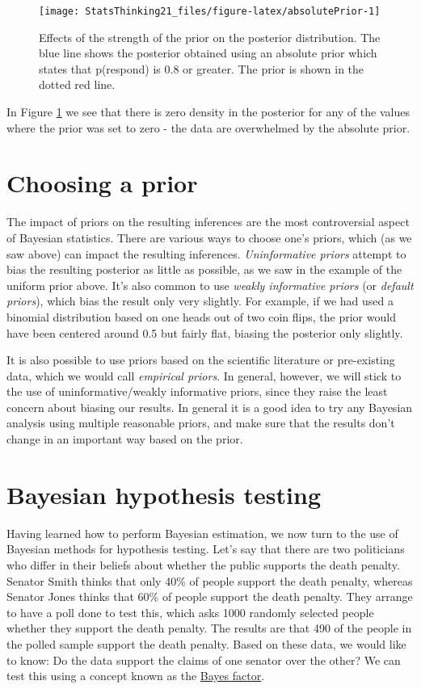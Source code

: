 \documentclass[]{book}
\theoremstyle{definition}
\theoremstyle{definition}
\theoremstyle{definition}
\theoremstyle{remark}
\begin{document}
\begin{figure}
\texttt{[image: StatsThinking21\_files/figure-latex/absolutePrior-1]} \caption{Effects of the strength of the prior on the posterior distribution. The blue line shows the posterior obtained using an absolute prior which states that p(respond) is 0.8 or greater.  The prior is shown in the dotted red line.}\label{fig:absolutePrior}
\end{figure}

In Figure \ref{fig:absolutePrior} we see that there is zero density in
the posterior for any of the values where the prior was set to zero -
the data are overwhelmed by the absolute prior.

\section{Choosing a prior}\label{choosing-a-prior}

The impact of priors on the resulting inferences are the most
controversial aspect of Bayesian statistics. There are various ways to
choose one's priors, which (as we saw above) can impact the resulting
inferences. \emph{Uninformative priors} attempt to bias the resulting
posterior as little as possible, as we saw in the example of the uniform
prior above. It's also common to use \emph{weakly informative priors}
(or \emph{default priors}), which bias the result only very slightly.
For example, if we had used a binomial distribution based on one heads
out of two coin flips, the prior would have been centered around 0.5 but
fairly flat, biasing the posterior only slightly.

It is also possible to use priors based on the scientific literature or
pre-existing data, which we would call \emph{empirical priors}. In
general, however, we will stick to the use of uninformative/weakly
informative priors, since they raise the least concern about biasing our
results. In general it is a good idea to try any Bayesian analysis using
multiple reasonable priors, and make sure that the results don't change
in an important way based on the prior.

\section{Bayesian hypothesis testing}\label{bayesian-hypothesis-testing}

Having learned how to perform Bayesian estimation, we now turn to the
use of Bayesian methods for hypothesis testing. Let's say that there are
two politicians who differ in their beliefs about whether the public
supports the death penalty. Senator Smith thinks that only 40\% of
people support the death penalty, whereas Senator Jones thinks that 60\%
of people support the death penalty. They arrange to have a poll done to
test this, which asks 1000 randomly selected people whether they support
the death penalty. The results are that 490 of the people in the polled
sample support the death penalty. Based on these data, we would like to
know: Do the data support the claims of one senator over the other? We
can test this using a concept known as the
\href{https://bayesfactor.blogspot.com/2014/02/the-bayesfactor-package-this-blog-is.html}{Bayes
factor}.
\end{document}
